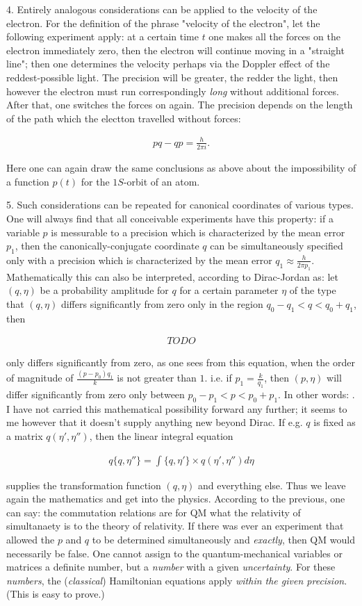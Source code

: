 \documentclass{article}
\newcommand{\uequ}[1]{
\begin{align*}
#1
\end{align*}
}
\begin{document}
4. Entirely analogous considerations can be applied to the velocity of the electron. For the definition of the phrase "velocity of the electron", let the following experiment apply: at a certain time $t$ one makes all the forces on the electron immediately zero, then the electron will continue moving in a "straight line"; then one determines the velocity perhaps via the Doppler effect of the reddest-possible light. The precision will be greater, the redder the light, then however the  electron must run correspondingly \textit{long} without additional forces. After that, one switches the forces on again. The precision depends on the length of the path which the electton travelled without forces:
\uequ{
pq-qp=\frac{h}{2\pi i}.
}

Here one can again draw the same conclusions as above about the impossibility of a function $p(t)$ for the $1S$-orbit of an atom.

5. Such considerations can be repeated for canonical coordinates of various types. One will always find that all conceivable experiments have this property: if a variable $p$ is messurable to a precision which is characterized by the mean error $p_1$, then the canonically-conjugate coordinate $q$ can be simultaneously specified only with a precision which is characterized by the mean error $q_1 \approx \frac{h}{2\pi p_1}$. Mathematically this can also be interpreted, according to Dirac-Jordan as: let $(q,\eta)$ be a probability amplitude for $q$ for a certain parameter $\eta$ of the type that $(q,\eta)$ differs significantly from zero only in the region $q_0-q_1 < q < q_0+q_1$, then
\uequ{
TODO
}
only differs significantly from zero, as one sees from this equation, when the order of magnitude of $\frac{(p-p_0)q_1}{k}$ is not greater than $1$. i.e. if $p_1=\frac{k}{q_1}$, then $(p,\eta)$ will differ significantly from zero only between $p_0-p_1 < p < p_0 + p_1$. In other words: . I have not carried this mathematical possibility forward any further; it seems to me however that it doesn't supply anything new beyond Dirac. If e.g. $q$ is fixed as a matrix $q(\eta',\eta'')$, then the linear integral equation
\uequ{
q\{q,\eta''\} = \int\{q,\eta'\}\times q(\eta', \eta'') d\eta
}
supplies the transformation function $(q,\eta)$ and everything else. Thus we leave again the mathematics and get into the physics. According to the previous, one can say: the commutation relations are for QM what the relativity of simultanaety is to the theory of relativity. If there was ever an experiment that allowed the $p$ and $q$ to be determined simultaneously and \textit{exactly}, then QM would necessarily be false. One cannot assign to the quantum-mechanical variables or matrices a definite number, but a \textit{number} with a given \textit{uncertainty}. For these \textit{numbers}, the (\textit{classical}) Hamiltonian equations apply \textit{within the given precision}. (This is easy to prove.)
\end{document}
